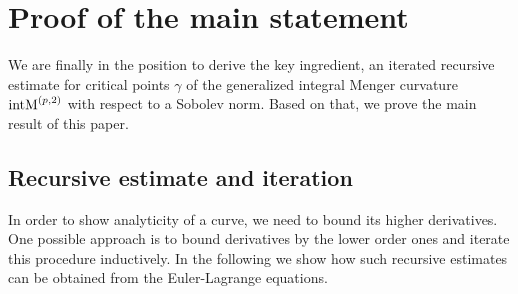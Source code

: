 \section{Proof of the main statement}
\label{sec:MainProof}

We are finally in the position to derive the key ingredient, an iterated recursive estimate for critical points $\gamma$ of the generalized integral Menger curvature $\operatorname{intM}^{\left(p,2\right)}$ with respect to a Sobolev norm. Based on that, we prove the main result of this paper.

\subsection{Recursive estimate and iteration}
\label{subsec:RecursiveEstimate}

In order to show analyticity of a curve, we need to bound its higher derivatives. One possible approach is to bound derivatives by the lower order ones and iterate this procedure inductively. In the following we show how such recursive estimates can be obtained from the Euler-Lagrange equations. 

